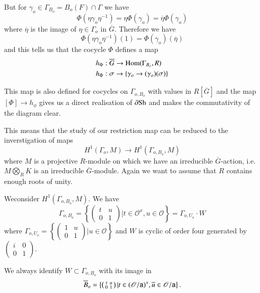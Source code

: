 But for $\gamma_{o}\in \Gamma_{B_{o}}=B_{o}(F)\cap \Gamma$ we have
$$
\Phi(\eta\gamma_{o}\eta^{-1})=\eta\Phi(\gamma_{o})=\overline{\eta}\Phi(\gamma_{o})
$$
where $\overline{\eta}$ is the image of $\eta\in \Gamma_{o}$ in $\overline{G}$. Therefore we have
$$
\Phi(\eta\gamma_{o}\eta^{-1})(1)=\Phi(\gamma_{o})(\overline{\eta})
$$
and this tells us that the cocycle $\Phi$ defines a map
\begin{align*}
& h_{\Phi}:\overline{G}\to \operatorname{Hom}(\Gamma_{B_{o}},R)\\
& h_{\Phi}:\sigma\to \{\gamma_{o}\to (\gamma_{o})(\sigma)\}
\end{align*}

This map is also defined for cocycles on $\Gamma_{o,B_{o}}$ with values in $R[\overline{G}]$ and the map $[\Phi]\to h_{\phi}$ gives us a direct realisation of $\partial \mathrm{Sh}$ and makes the commutativity of the diagram clear.

This means that the study of our restriction map can be reduced to the inverstigation of maps
$$
H^{1}(\Gamma_{o},M)\to H^{1}(\Gamma_{o,B_{o}},M)
$$
where $M$ is a projective $R$-module on which we have an irreducible $\overline{G}$-action, i.e. $M\bigotimes\limits_{R}K$ is an irreducible $\overline{G}$-module. Again we want to assume that $R$ contains enough roots of unity.

We\pageoriginale consider $H^{1}(\Gamma_{o,B_{o}},M)$. We have
$$
\Gamma_{o,B_{o}}=\left\{\left(\begin{matrix} t & u\\ 0 & 1\end{matrix}\right)|t\in \mathscr{O}^{x},u\in \mathscr{O}\right\}=\Gamma_{o,U_{o}}\cdot W
$$
where $\Gamma_{o,U_{o}}=\left\{\left(\begin{smallmatrix} 1 & u\\ 0 & 1\end{smallmatrix}\right)|u\in \mathscr{O}\right\}$ and $W$ is cyclic of order four generated by $\left(\begin{smallmatrix} i & 0\\ 0 & 1\end{smallmatrix}\right)$.

We always identify $W\subset \Gamma_{o,B_{o}}$ with its image in 
$$
\overline{B}_{o}=\left\{\left(\begin{smallmatrix} t & u\\ 0 & 1\end{smallmatrix}\right) | t\in (\mathscr{O}/\mathsf{a})^{x}, \overline{u}\in \mathscr{O}/\mathsf{a}\right\}.
$$

